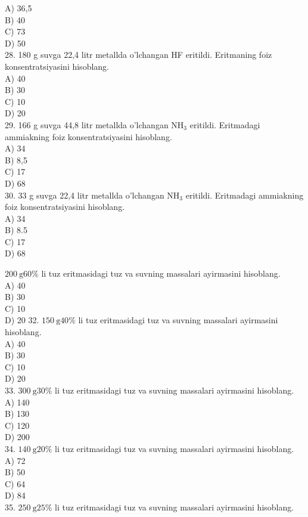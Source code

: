 A) 36,5\\
B) 40\\
C) 73\\
D) 50\\
28. 180 g suvga 22,4 litr metallda o'lchangan HF eritildi. Eritmaning foiz konsentratsiyasini hisoblang.\\
A) 40\\
B) 30\\
C) 10\\
D) 20\\
29. 166 g suvga 44,8 litr metallda o'lchangan $\mathrm{NH}_{3}$ eritildi. Eritmadagi\\
ammiakning foiz konsentratsiyasini hisoblang.\\
A) 34\\
B) 8,5\\
C) 17\\
D) 68\\
30. 33 g suvga 22,4 litr metallda o'lchangan $\mathrm{NH}_{3}$ eritildi. Eritmadagi ammiakning foiz konsentratsiyasini hisoblang.\\
A) 34\\
B) 8.5\\
C) 17\\
D) 68
  \item $200 \mathrm{~g} 60 \%$ li tuz eritmasidagi tuz va suvning massalari ayirmasini hisoblang.\\
A) 40\\
B) 30\\
C) 10\\
D) 20
32. $150 \mathrm{~g} 40 \%$ li tuz eritmasidagi tuz va suvning massalari ayirmasini hisoblang.\\
A) 40\\
B) 30\\
C) 10\\
D) 20\\
33. $300 \mathrm{~g} 30 \%$ li tuz eritmasidagi tuz va suvning massalari ayirmasini hisoblang.\\
A) 140\\
B) 130\\
C) 120\\
D) 200\\
34. $140 \mathrm{~g} 20 \%$ li tuz eritmasidagi tuz va suvning massalari ayirmasini hisoblang.\\
A) 72\\
B) 50\\
C) 64\\
D) 84\\
35. $250 \mathrm{~g} 25 \%$ li tuz eritmasidagi tuz va suvning massalari ayirmasini hisoblang.\\
